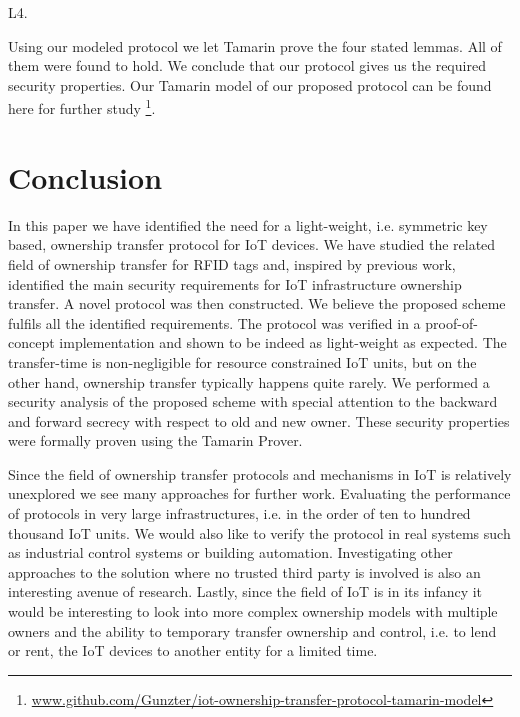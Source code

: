 {\begin{labeling}{L4.}
	
\end{labeling}


Using our modeled protocol we let Tamarin prove the four stated lemmas. All of them were found to hold. We conclude that our protocol gives us the required security properties. 
Our Tamarin model of our proposed protocol can be found here for further study \footnote{\url{www.github.com/Gunzter/iot-ownership-transfer-protocol-tamarin-model}}.


\section{Conclusion}
\label{sec:ot:Conclusion}
In this paper we have identified the need for a light-weight, i.e. symmetric key based, ownership transfer protocol for IoT devices. We have studied the related field of ownership transfer for RFID tags and, inspired by previous work, identified the main security requirements for IoT infrastructure ownership transfer. A novel protocol was then constructed. We believe the proposed scheme fulfils all the identified requirements. The protocol was verified in a proof-of-concept implementation and shown to be indeed as light-weight as expected. The transfer-time is non-negligible for resource constrained IoT units, but on the other hand, ownership transfer typically happens quite rarely.  We performed a security analysis of the proposed scheme with special attention to the backward and forward secrecy with respect to old and new owner. These security properties were formally proven using the Tamarin Prover. 

Since the field of ownership transfer protocols and mechanisms in IoT is relatively unexplored we see many approaches for further work. Evaluating the performance of protocols in very large infrastructures, i.e. in the order of ten to hundred thousand IoT units. We would also like to verify the protocol in real systems such as industrial control systems or building automation. Investigating other approaches to the solution where no trusted third party is involved is also an interesting avenue of research. Lastly, since the field of IoT is in its infancy it would be interesting to look into more complex ownership models with multiple owners and the ability to temporary transfer ownership and control, i.e. to lend or rent, the IoT devices to another entity for a limited time.

{\raggedright
        \printbibliography[segment=\therefsegment,heading=subbibliography]
}
}




